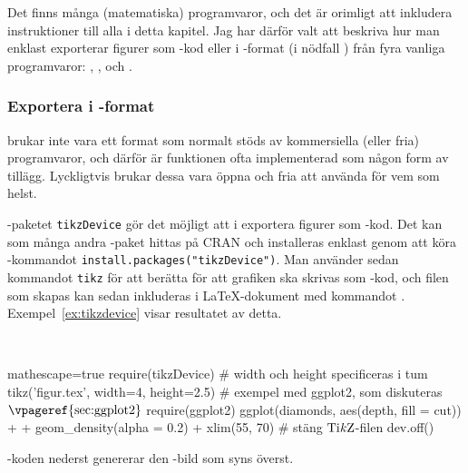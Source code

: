 \documentclass[../../latex.tex]{subfiles}
\begin{document}
Det finns många (matematiska) programvaror, och det är orimligt att
inkludera instruktioner till alla i detta kapitel. Jag har därför valt
att beskriva hur man enklast exporterar figurer som \PGFTikZ-kod eller
i \PDF-format (i nödfall \PNG) från fyra vanliga programvaror:
\Rlogo, \MATLAB, \Mathematica och \gnuplot.

\subsubsection{Exportera i \PGFTikZ-format}
\PGFTikZ brukar inte vara ett format som normalt stöds av kommersiella
(eller fria) programvaror, och därför är funktionen ofta implementerad
som någon form av tillägg. Lyckligtvis brukar dessa vara öppna och fria
att använda för vem som helst.

\Rlogo-paketet \texttt{tikzDevice} \cite{Sharpsteen12} gör det möjligt
att i \Rlogo exportera figurer som \PGFTikZ-kod. Det kan som många andra
\Rlogo-paket hittas på CRAN och installeras enklast genom att köra
\Rlogo-kommandot \verb|install.packages("tikzDevice")|. Man använder
sedan kommandot \texttt{tikz} för att berätta för \Rlogo att grafiken
ska skrivas som \PGFTikZ-kod, och filen som skapas kan sedan inkluderas
i \LaTeX-dokument med kommandot .
Exempel~\vref{ex:tikzdevice} visar resultatet av detta.

\begin{kod}[tbp]
	\centering
	\begin{minipage}{\textwidth}
		\centering
		
	\end{minipage}
	\\[1ex]
	\begin{minipage}{\textwidth}
		\begin{rcode*}{mathescape=true}
require(tikzDevice)
# width och height specificeras i tum
tikz('figur.tex', width=4, height=2.5)
# exempel med ggplot2, som diskuteras$\text{\vpageref{sec:ggplot2}}$
require(ggplot2)
ggplot(diamonds, aes(depth, fill = cut)) +
  + geom_density(alpha = 0.2) + xlim(55, 70)
# stäng $\text{Ti\textit{k}Z}$-filen
dev.off()
		\end{rcode*}
	\end{minipage}
	\caption{\Rlogo-koden nederst genererar den \PGFTikZ-bild som
	syns överst.}
	\label{ex:tikzdevice}
\end{kod}

\end{document}
